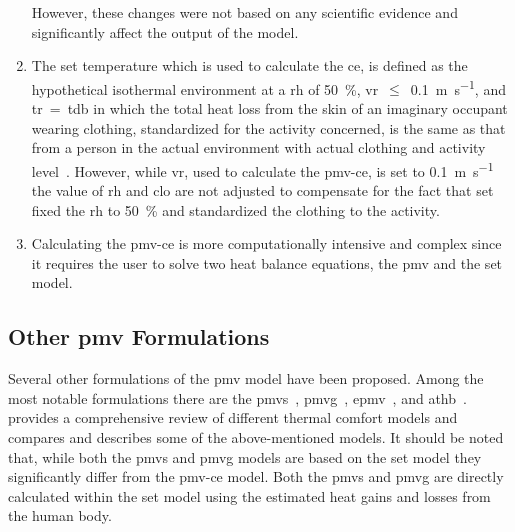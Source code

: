 \begin{enumerate}
    However, these changes were not based on any scientific evidence and significantly affect the output of the model.
    \item The \ac{set} temperature which is used to calculate the \ac{ce}, is defined as the hypothetical isothermal environment at a \ac{rh} of \qty{50}{\percent}, \ac{vr}~$\leq$~\qty{0.1}{\m\per\s}, and \ac{tr}~=~\ac{tdb} in which the total heat loss from the skin of an imaginary occupant wearing clothing, standardized for the activity concerned, is the same as that from a person in the actual environment with actual clothing and activity level~\cite{ashrae552023}.
    However, while \ac{vr}, used to calculate the \ac{pmv-ce}, is set to \qty{0.1}{\m\per\s} the value of \ac{rh} and \ac{clo} are not adjusted to compensate for the fact that \ac{set} fixed the \ac{rh} to \qty{50}{\percent} and standardized the clothing to the activity.
    \item Calculating the \ac{pmv-ce} is more computationally intensive and complex since it requires the user to solve two heat balance equations, the \ac{pmv} and the \ac{set} model.
\end{enumerate}

\subsection{Other \ac{pmv} Formulations}\label{subsec:other-pmv-formulations}
Several other formulations of the \ac{pmv} model have been proposed.
Among the most notable formulations there are the \ac{pmvs}~\cite{GaggeSET}, \ac{pmvg}~\cite{GaggeSET},  \ac{epmv}~\cite{Toftum2002}, and \ac{athb}~\cite{Schweiker2022}.
 provides a comprehensive review of different thermal comfort models and compares and describes some of the above-mentioned models.
It should be noted that, while both the \ac{pmvs} and \ac{pmvg} models are based on the \ac{set} model they significantly differ from the \ac{pmv-ce} model.
Both the \ac{pmvs} and \ac{pmvg} are directly calculated within the \ac{set} model using the estimated heat gains and losses from the human body.

